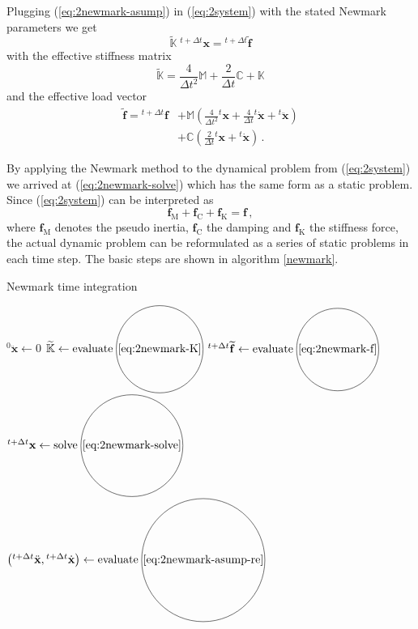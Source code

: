 \documentclass[conference]{journal}
\newcommand*\circled[1]{\tikz[baseline=(char.base)]{
   \node[shape=circle,draw,inner sep=1pt] (char) {#1};}}
\newcommand{\bb}[1]{\mathbb{#1}}
\newcommand{\B}[1]{\mathbf{#1}}
\newcommand{\Bx}{\B{x}}
\newcommand{\xt}{{}^{t}\Bx}
\newcommand{\vt}{{}^{t}\dot{\Bx}}
\newcommand{\at}{{}^{t}\ddot{\Bx}}
\newcommand{\xtt}{{}^{t+\Delta t}\Bx}
\newcommand{\vtt}{{}^{t+\Delta t}\dot{\Bx}}
\newcommand{\att}{{}^{t+\Delta t}\ddot{\Bx}}
\newcommand{\M}{\bb{M}}
\newcommand{\C}{\bb{C}}
\newcommand{\K}{\bb{K}}
\begin{document}
	Plugging (\ref{eq:2newmark-asump}) in (\ref{eq:2system}) with the stated Newmark parameters we get
	\begin{equation} \label{eq:2newmark-solve}
	\widetilde{\K}\;\xtt = {}^{t+\Delta t}\widetilde{\B{f}}
	\end{equation}
	with the effective stiffness matrix
	\begin{equation} \label{eq:2newmark-K}
	\widetilde{\K} = \frac{4}{\Delta t^2} \M + \frac{2}{\Delta t} \C + \K
	\end{equation}
	and the effective load vector
	\begin{equation} \label{eq:2newmark-f}
	\begin{aligned}
	\widetilde{\B{f}} = {}^{t+\Delta t}{\B{f}}
	&+ \M \left( \frac{4}{\Delta t^2} \xt + \frac{4}{\Delta t} \vt + \at \right)
	\\
	&+ \C \left( \frac{2}{\Delta t} \xt + \vt \right)\,.
	\end{aligned}
	\end{equation}

	By applying the Newmark method to the dynamical problem from (\ref{eq:2system}) we arrived at (\ref{eq:2newmark-solve}) which has the same form as a static problem. Since (\ref{eq:2system}) can be interpreted as
	\begin{equation} \label{eq:2system-forces}
	\B{f}_\mathrm{M} + \B{f}_\mathrm{C} + \B{f}_\mathrm{K} = \B{f}\,,
	\end{equation}
	where $\B{f}_\mathrm{M}$ denotes the pseudo inertia, $\B{f}_\mathrm{C}$ the damping and $\B{f}_\mathrm{K}$ the stiffness force, the actual dynamic problem can be reformulated as a series of static problems in each time step. The basic steps are shown in algorithm \ref{newmark}.

	\begin{algorithm}
	\caption{Newmark time integration}\label{newmark}
	\begin{algorithmic}[1]
	\Procedure{Newmark}{$\M,\, \C,\, \K,\, \B{f}(t),\, \Delta t,\, t_\mathrm{end},\, {}^{0}\Bx,\, {}^{0}\dot{\Bx}$}
	\State ${}^{0}\ddot{\Bx} \gets 0$
	\State $\widetilde{\K} \gets \mathrm{evaluate} \; \circled{\ref{eq:2newmark-K}}$
		\State ${}^{t+\Delta t}\widetilde{\B{f}} \gets \mathrm{evaluate} \; \circled{\ref{eq:2newmark-f}}$
		\State $\xtt \gets \mathrm{solve} \; \circled{\ref{eq:2newmark-solve}}$
		\State $\left(\att,\vtt\right) \gets \mathrm{evaluate} \; \circled{\ref{eq:2newmark-asump-re}}$
	\EndFor
	\EndProcedure
	\end{algorithmic}
	\end{algorithm}
\end{document}
